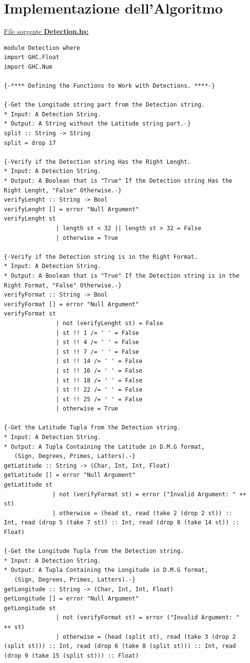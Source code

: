 \documentclass{article}
\begin{document}
\section{Implementazione dell'Algoritmo}
\raggedright
\underline{File sorgente \textbf{Detection.hs:}}
\lstset{language=Haskell}
\begin{lstlisting}
module Detection where
import GHC.Float
import GHC.Num

{-**** Defining the Functions to Work with Detections. ****-}
            
{-Get the Longitude string part from the Detection string.
* Input: A Detection String.
* Output: A String without the Latitude string part.-}
split :: String -> String
split = drop 17 

{-Verify if the Detection string Has the Right Lenght.
* Input: A Detection String.
* Output: A Boolean that is "True" If the Detection string Has the Right Lenght, "False" Otherwise.-}
verifyLenght :: String -> Bool
verifyLenght [] = error "Null Argument"
verifyLenght st
               | length st < 32 || length st > 32 = False
               | otherwise = True

{-Verify if the Detection string is in the Right Format.
* Input: A Detection String.
* Output: A Boolean that is "True" If the Detection string is in the Right Format, "False" Otherwise.-}
verifyFormat :: String -> Bool
verifyFormat [] = error "Null Argument"
verifyFormat st
               | not (verifyLenght st) = False
               | st !! 1 /= ' ' = False
               | st !! 4 /= ' ' = False
               | st !! 7 /= ' ' = False
               | st !! 14 /= ' ' = False
               | st !! 16 /= ' ' = False
               | st !! 18 /= ' ' = False
               | st !! 22 /= ' ' = False
               | st !! 25 /= ' ' = False
               | otherwise = True

{-Get the Latitude Tupla from the Detection string.
* Input: A Detection String.
* Output: A Tupla Containing the Latitude in D.M.G format,
   (Sign, Degrees, Primes, Latters).-}
getLatitude :: String -> (Char, Int, Int, Float)
getLatitude [] = error "Null Argument"
getLatitude st
              | not (verifyFormat st) = error ("Invalid Argument: " ++ st)
              | otherwise = (head st, read (take 2 (drop 2 st)) :: Int, read (drop 5 (take 7 st)) :: Int, read (drop 8 (take 14 st)) :: Float)

{-Get the Longitude Tupla from the Detection string.
* Input: A Detection String.
* Output: A Tupla Containing the Longitude in D.M.G format,
   (Sign, Degrees, Primes, Latters).-}
getLongitude :: String -> (Char, Int, Int, Float)
getLongitude [] = error "Null Argument"
getLongitude st
               | not (verifyFormat st) = error ("Invalid Argument: " ++ st)
               | otherwise = (head (split st), read (take 3 (drop 2 (split st))) :: Int, read (drop 6 (take 8 (split st))) :: Int, read (drop 9 (take 15 (split st))) :: Float)


\end{lstlisting}
\end{document}
